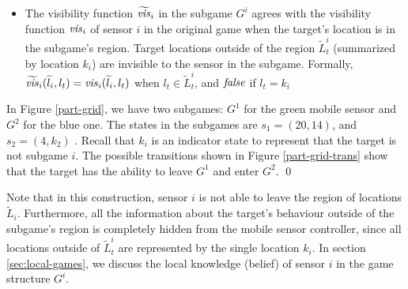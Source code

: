 \begin{itemize}
  \item The visibility function $\widetilde{\mathit{vis}}_i$ in the subgame $G^i$ agrees with the visibility function $\mathit{vis}_i$ of sensor $i$ in the original game when the target's location is in the subgame's region. Target locations outside of the region $\widetilde L_t^i$  (summarized by location $k_i$) are invisible to the sensor in the subgame. Formally, $\widetilde{\mathit{vis}}_i(\widetilde{l}_i,l_t) = \mathit{vis}_i(\widetilde{l}_i,l_t)$  when $l_t \in \widetilde{L}_t^i$, and $\mathit{false}$ if $l_t  = k_i$
\end{itemize}
\begin{example}
In Figure \ref{part-grid}, we have two subgames: $G^1$ for the green mobile sensor and $G^2$ for the blue one. The states in the subgames are $s_1 = (20,14)$, and $s_2 = (4,k_2)$ . Recall that $k_i$ is an indicator state to represent that the target is not subgame $i$. The possible transitions shown in Figure \ref{part-grid-trans} show that the target has the ability to leave $G^1$ and enter $G^2$. 
\qed
\end{example}

Note that in this construction, sensor $i$ is not able to leave the region of locations $\widetilde{L}_i$. Furthermore, all the information about the target's behaviour outside of  the subgame's region is completely hidden from the mobile sensor controller, since all locations outside of  $\widetilde{L}_t^i$ are represented by the single location $k_i$.
In section \ref{sec:local-games}, we discuss the local knowledge (belief)  of sensor $i$ in the game structure $G^i$.
 

